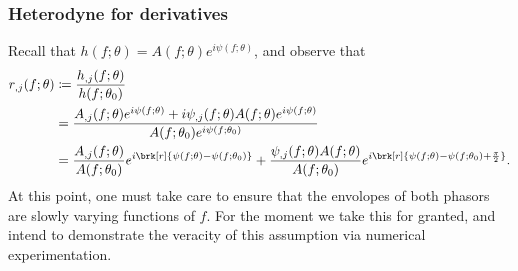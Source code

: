 \subsubsection{Heterodyne for derivatives}
Recall that $h(f; \theta) = A(f; \theta) e^{i \psi(f;\theta)}$, and observe that
\begin{align*}
r_{,j}(f;\theta) &\defn \frac{h_{,j}(f;\theta)}{h(f;\theta_0)} \\
&= \frac{A_{,j}(f;\theta) e^{i \psi(f;\theta)} + i \psi_{,j}(f;\theta) A(f;\theta) e^{i \psi(f;\theta)}}{A(f;\theta_0) e^{i \psi(f;\theta_0)}} \\
&= \frac{A_{,j}(f;\theta)}{A(f;\theta_0)} e^{i \brk[r]{\psi(f;\theta) - \psi(f;\theta_0)}} + \frac{\psi_{,j}(f;\theta)A(f;\theta)}{A(f;\theta_0)}e^{i \brk[r]{\psi(f;\theta) - \psi(f;\theta_0) + \frac{\pi}{2}}}. \\
\end{align*}
At this point, one must take care to ensure that the envolopes of both phasors are slowly varying functions of $f$. For the moment we take this for granted, and intend to demonstrate the veracity of this assumption via numerical experimentation.

